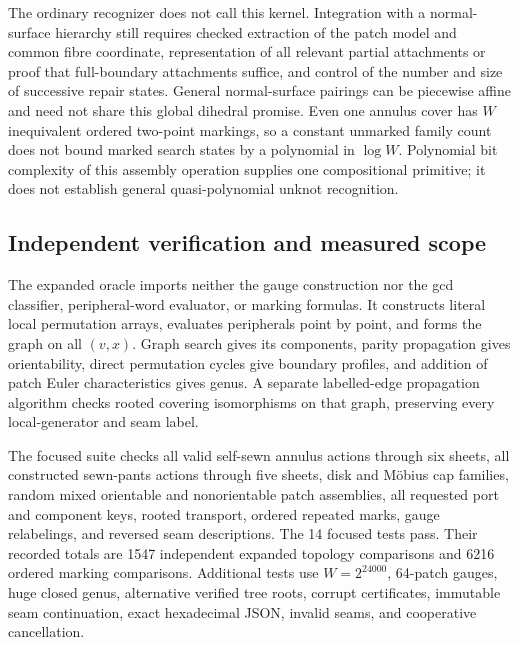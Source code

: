 The ordinary recognizer does not call this kernel.  Integration with a
normal-surface hierarchy still requires checked extraction of the patch
model and common fibre coordinate, representation of all relevant partial
attachments or proof that full-boundary attachments suffice, and control
of the number and size of successive repair states.  General normal-surface
pairings can be piecewise affine and need not share this global dihedral
promise.  Even one annulus cover has $W$ inequivalent ordered two-point
markings, so a constant unmarked family count does not bound marked search
states by a polynomial in $\log W$.  Polynomial bit complexity of this
assembly operation supplies one compositional primitive; it does not
establish general quasi-polynomial unknot recognition.

\subsection{Independent verification and measured scope}

The expanded oracle imports neither the gauge construction nor the gcd
classifier, peripheral-word evaluator, or marking formulas.  It constructs
literal local permutation arrays, evaluates peripherals point by point,
and forms the graph on all $(v,x)$.  Graph search gives its components,
parity propagation gives orientability, direct permutation cycles give
boundary profiles, and addition of patch Euler characteristics gives genus.
A separate labelled-edge propagation algorithm checks rooted covering
isomorphisms on that graph, preserving every local-generator and seam label.

The focused suite checks all valid self-sewn annulus actions through six
sheets, all constructed sewn-pants actions through five sheets, disk and
M\"obius cap families, random mixed orientable and nonorientable patch
assemblies, all requested port and component keys, rooted transport,
ordered repeated marks, gauge relabelings, and reversed seam descriptions.
The 14 focused tests pass.  Their recorded totals are 1547 independent expanded topology comparisons and
6216 ordered marking comparisons.  Additional tests use $W=2^{24000}$,
64-patch gauges, huge closed genus, alternative verified tree roots,
corrupt certificates, immutable seam continuation, exact hexadecimal JSON,
invalid seams, and cooperative cancellation.

